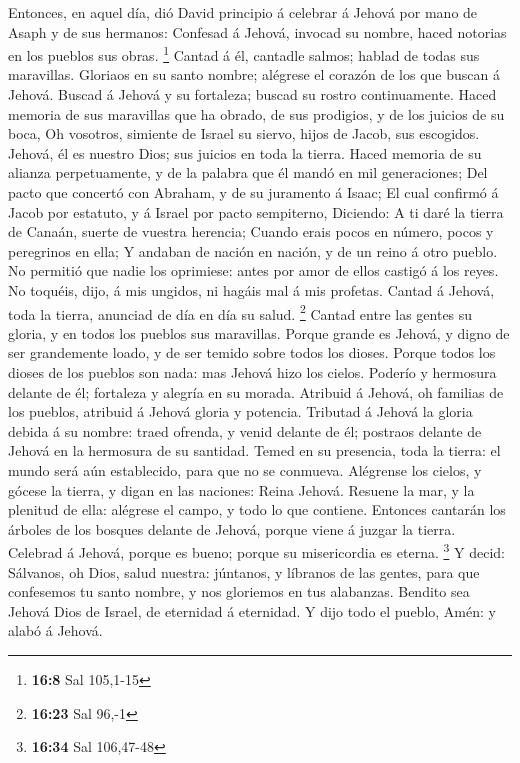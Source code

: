  Entonces, en aquel día, dió David principio á celebrar á
Jehová por mano de Asaph y de sus hermanos:  Confesad á
Jehová, invocad su nombre, haced notorias en los pueblos sus obras.
\footnote{\textbf{16:8} Sal 105,1-15}  Cantad á él, cantadle
salmos; hablad de todas sus maravillas.  Gloriaos en su
santo nombre; alégrese el corazón de los que buscan á Jehová.
 Buscad á Jehová y su fortaleza; buscad su rostro
continuamente.  Haced memoria de sus maravillas que ha
obrado, de sus prodigios, y de los juicios de su boca,  Oh
vosotros, simiente de Israel su siervo, hijos de Jacob, sus escogidos.
 Jehová, él es nuestro Dios; sus juicios en toda la tierra.
 Haced memoria de su alianza perpetuamente, y de la palabra
que él mandó en mil generaciones;  Del pacto que concertó
con Abraham, y de su juramento á Isaac;  El cual confirmó á
Jacob por estatuto, y á Israel por pacto sempiterno, 
Diciendo: A ti daré la tierra de Canaán, suerte de vuestra herencia;
 Cuando erais pocos en número, pocos y peregrinos en ella;
 Y andaban de nación en nación, y de un reino á otro
pueblo.  No permitió que nadie los oprimiese: antes por
amor de ellos castigó á los reyes.  No toquéis, dijo, á mis
ungidos, ni hagáis mal á mis profetas.  Cantad á Jehová,
toda la tierra, anunciad de día en día su salud. \footnote{\textbf{16:23}
  Sal 96,-1}  Cantad entre las gentes su gloria, y en todos
los pueblos sus maravillas.  Porque grande es Jehová, y
digno de ser grandemente loado, y de ser temido sobre todos los dioses.
 Porque todos los dioses de los pueblos son nada: mas
Jehová hizo los cielos.  Poderío y hermosura delante de él;
fortaleza y alegría en su morada.  Atribuid á Jehová, oh
familias de los pueblos, atribuid á Jehová gloria y potencia.
 Tributad á Jehová la gloria debida á su nombre: traed
ofrenda, y venid delante de él; postraos delante de Jehová en la
hermosura de su santidad.  Temed en su presencia, toda la
tierra: el mundo será aún establecido, para que no se conmueva.
 Alégrense los cielos, y gócese la tierra, y digan en las
naciones: Reina Jehová.  Resuene la mar, y la plenitud de
ella: alégrese el campo, y todo lo que contiene.  Entonces
cantarán los árboles de los bosques delante de Jehová, porque viene á
juzgar la tierra.  Celebrad á Jehová, porque es bueno;
porque su misericordia es eterna. \footnote{\textbf{16:34} Sal 106,47-48}
 Y decid: Sálvanos, oh Dios, salud nuestra: júntanos, y
líbranos de las gentes, para que confesemos tu santo nombre, y nos
gloriemos en tus alabanzas.  Bendito sea Jehová Dios de
Israel, de eternidad á eternidad. Y dijo todo el pueblo, Amén: y alabó á
Jehová.

